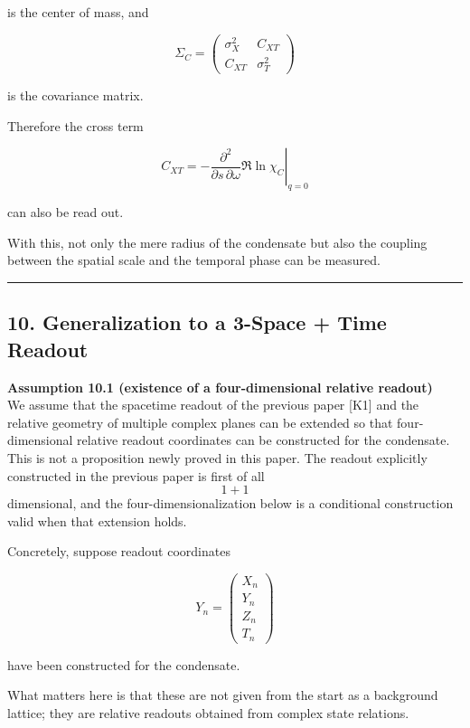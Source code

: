 \documentclass[
  a4paper,
]{article}
\begin{document}
is the center of mass, and

\[
\Sigma_C
=
\begin{pmatrix}
\sigma_X^2 & C_{XT}\\
C_{XT} & \sigma_T^2
\end{pmatrix}
\]

is the covariance matrix.

Therefore the cross term

\[
\boxed{
C_{XT}
=
-
\left.
\frac{\partial^2}
{\partial s\,\partial\omega}
\Re\ln\chi_C
\right|_{q=0}
}
\tag{28}
\]

can also be read out.

With this, not only the mere radius of the condensate but also the
coupling between the spatial scale and the temporal phase can be
measured.

\begin{center}\rule{0.5\linewidth}{0.5pt}\end{center}

\subsection{10. Generalization to a 3-Space + Time
Readout}\label{generalization-to-a-3-space-time-readout}

\textbf{Assumption 10.1 (existence of a four-dimensional relative
readout)}\\
We assume that the spacetime readout of the previous paper {[}K1{]} and
the relative geometry of multiple complex planes can be extended so that
four-dimensional relative readout coordinates can be constructed for the
condensate. This is not a proposition newly proved in this paper. The
readout explicitly constructed in the previous paper is first of all
\[1+1\] dimensional, and the four-dimensionalization below is a
conditional construction valid when that extension holds.

Concretely, suppose readout coordinates

\[
Y_n
=
\begin{pmatrix}
X_n\\
Y_n\\
Z_n\\
T_n
\end{pmatrix}
\]

have been constructed for the condensate.

What matters here is that these are not given from the start as a
background lattice; they are relative readouts obtained from complex
state relations.
\end{document}
